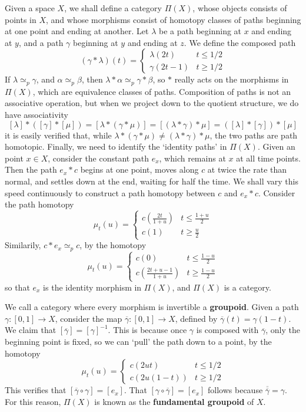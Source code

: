 Given a space $X$, we shall define a category $\Pi(X)$, whose objects consists of points in $X$, and whose morphisms consist of homotopy classes of paths beginning at one point and ending at another. Let $\lambda$ be a path beginning at $x$ and ending at $y$, and a path $\gamma$ beginning at $y$ and ending at $z$. We define the composed path
%
\[ (\gamma * \lambda)(t) = \begin{cases} \lambda(2t) & t \leq 1/2 \\ \gamma(2t - 1) & t \geq 1/2 \end{cases} \]
%
If $\lambda \simeq_p \gamma$, and $\alpha \simeq_p \beta$, then $\lambda * \alpha \simeq_p \gamma * \beta$, so $*$ really acts on the morphisms in $\Pi(X)$, which are equivalence classes of paths. Composition of paths is not an associative operation, but when we project down to the quotient structure, we do have associativity
%
\[ [\lambda] * ([\gamma] * [\mu]) = [\lambda * (\gamma * \mu)] = [(\lambda * \gamma) * \mu] = ([\lambda] * [\gamma]) * [\mu] \]
%
it is easily verified that, while $\lambda * (\gamma * \mu) \neq (\lambda * \gamma) * \mu$, the two paths are path homotopic. Finally, we need to identify the `identity paths' in $\Pi(X)$. Given an point $x \in X$, consider the constant path $e_x$, which remains at $x$ at all time points. Then the path $e_x * c$ begins at one point, moves along $c$ at twice the rate than normal, and settles down at the end, waiting for half the time. We shall vary this speed continuously to construct a path homotopy between $c$ and $e_x * c$. Consider the path homotopy
%
\[ \mu_t(u) = \begin{cases} c(\frac{2t}{1+u}) & t \leq \frac{1 + u}{2} \\ c(1) & t \geq \frac{u}{2} \end{cases} \]
%
Similarily, $c * e_x \simeq_p c$, by the homotopy
%
\[ \mu_t(u) = \begin{cases} c(0) & t \leq \frac{1 - u}{2} \\ c(\frac{2t + u - 1}{1+u}) & t \geq \frac{1 - u}{2} \end{cases} \]
%
so that $e_x$ is the identity morphism in $\Pi(X)$, and $\Pi(X)$ is a category.

We call a category where every morphism is invertible a {\bf groupoid}. Given a path $\gamma: [0,1] \to X$, consider the map $\overline{\gamma}: [0,1] \to X$, defined by $\overline{\gamma}(t) = \gamma(1 - t)$. We claim that $[\overline{\gamma}] = [\gamma]^{-1}$. This is because once $\gamma$ is composed with $\overline{\gamma}$, only the beginning point is fixed, so we can `pull' the path down to a point, by the homotopy
%
\[ \mu_t(u) = \begin{cases} c(2ut) & t \leq 1/2 \\ c(2u(1-t)) & t \geq 1/2 \end{cases} \]
%
This verifies that $[\overline{\gamma} \circ \gamma] = [e_x]$. That $[\gamma \circ \overline{\gamma}] = [e_x]$ follows because $\overline{\overline{\gamma}} = \gamma$. For this reason, $\Pi(X)$ is known as the {\bf fundamental groupoid} of $X$.

